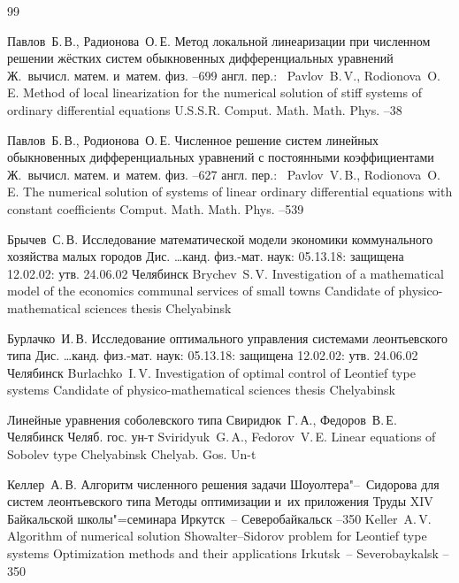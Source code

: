 \begin{thebibliography}{99}
        
        
\by Павлов~Б.\,В., Радионова~О.\,Е.
\paper Метод локальной линеаризации при численном решении жёстких систем обыкновенных дифференциальных уравнений
\jour Ж.~вычисл. матем. и~матем. физ.
--699
\transl англ. пер.:~
\by Pavlov~B.\,V., Rodionova~O.\,E.
\paper Method of local linearization for the numerical solution of stiff systems of ordinary differential equations
\jour U.S.S.R. Comput. Math. Math. Phys.
--38

\by Павлов~Б.\,В., Родионова~О.\,Е.
\paper Численное решение систем линейных обыкновенных дифференциальных уравнений с постоянными коэффициентами
\jour Ж.~вычисл. матем. и~матем. физ.
--627
\transl англ. пер.:~
\by Pavlov~V.\,B., Rodionova~O.\,E.
\paper The numerical solution of systems of linear ordinary differential equations with constant coefficients
\jour Comput. Math. Math. Phys.
--539


\by Брычев~С.\,В.
\thesis Исследование математической модели экономики коммунального хозяйства малых городов
\thesisinfo Дис. \dots канд. физ.-мат. наук: 05.13.18: защищена 12.02.02: утв. 24.06.02
\publaddr Челябинск
\misctransl 
\by Brychev~S.\,V.
\thesis Investigation of a mathematical model of the economics communal services of small towns
\thesisinfo Candidate of physico-mathematical sciences thesis
\publaddr Chelyabinsk

\by Бурлачко~И.\,В.
\thesis Исследование оптимального управления системами леонтьевского типа
\thesisinfo Дис. \dots канд. физ.-мат. наук: 05.13.18: защищена 12.02.02: утв. 24.06.02
\publaddr Челябинск
\misctransl
\by Burlachko~I.\,V.
\thesis Investigation of optimal control of  Leontief type systems
\thesisinfo Candidate of physico-mathematical sciences thesis
\publaddr Chelyabinsk


\book Линейные уравнения соболевского типа
\by Свиридюк~Г.\,А., Федоров~В.\,Е.
\publaddr Челябинск
\publ Челяб. гос. ун-т
\misctransl 
\by Sviridyuk~G.\,A., Fedorov~V.\,E.
\book Linear equations of Sobolev type
\publaddr Chelyabinsk
\publ Chelyab. Gos. Un-t


\by Келлер~А.\,В.
\paper Алгоритм численного решения задачи Шоуолтера"--~Сидорова для систем леонтьевского типа
\inbook Методы оптимизации и~их приложения
\bookinfo Труды XIV Байкальской школы"=семинара
\publaddr Иркутск~-- Северобайкальск
--350
\misctransl
\by Keller~A.\,V.
\paper Algorithm of numerical solution Showalter--Sidorov problem for  Leontief type systems
\inbook Optimization methods and their applications
\publaddr Irkutsk~-- Severobaykalsk 
--350



\end{thebibliography}
